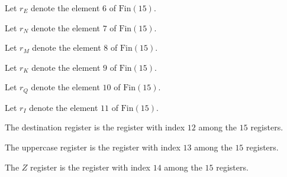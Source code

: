\begin{definition}[Index e]
\label{Complexity.PathHard.rE}
\leanok
Let $r_E$ denote the element $6$ of $\mathrm{Fin}(15)$.
\end{definition}

\begin{definition}[Index n]
\label{Complexity.PathHard.rN}
\leanok
Let $r_N$ denote the element $7$ of $\mathrm{Fin}(15)$.
\end{definition}

\begin{definition}[Index m]
\label{Complexity.PathHard.rM}
\leanok
Let $r_M$ denote the element $8$ of $\mathrm{Fin}(15)$.
\end{definition}

\begin{definition}[Index k]
\label{Complexity.PathHard.rK}
\leanok
Let $r_K$ denote the element $9$ of $\mathrm{Fin}(15)$.
\end{definition}

\begin{definition}[Index q]
\label{Complexity.PathHard.rQ}
\leanok
Let $r_Q$ denote the element $10$ of $\mathrm{Fin}(15)$.
\end{definition}

\begin{definition}[Index i]
\label{Complexity.PathHard.rI}
\leanok
Let $r_I$ denote the element $11$ of $\mathrm{Fin}(15)$.
\end{definition}

\begin{definition}
\label{Complexity.PathHard.rD}
\leanok
The destination register is the register with index $12$ among the $15$ registers.
\end{definition}

\begin{definition}
\label{Complexity.PathHard.rU}
\leanok
The uppercase register is the register with index $13$ among the $15$ registers.
\end{definition}

\begin{definition}
\label{Complexity.PathHard.rZ}
\leanok
The $Z$ register is the register with index $14$ among the $15$ registers.
\end{definition}

